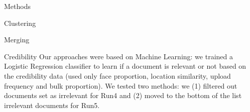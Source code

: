 \documentclass{acm_proc_article-me}
\begin{document}
\begin{section}{Methods}
\begin{subsection}{Clustering}
\begin{subsubsection}{Merging}



\end{subsubsection}

\end{subsection}

\begin{subsection}{Credibility}
Our approaches were based on Machine Learning: we trained a Logistic Regression classifier to learn if a document is relevant or not based on the credibility data (used only face proportion, location similarity, upload frequency and bulk proportion).
We tested two methods: we (1) filtered out documents set as irrelevant for Run4 and (2) moved to the bottom of the list irrelevant documents for Run5.

\end{subsection}
\end{section}
\end{document}
